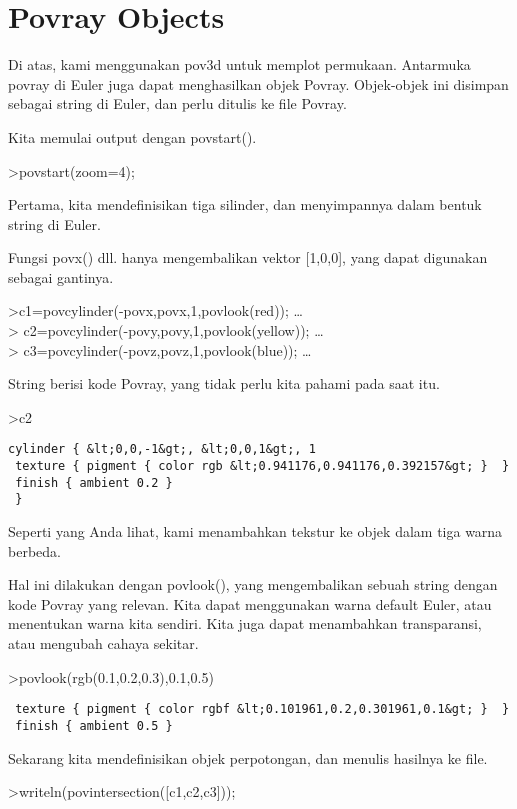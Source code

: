 \documentclass[
]{book}
\begin{document}
\chapter{Povray Objects}\label{povray-objects}

Di atas, kami menggunakan pov3d untuk memplot permukaan. Antarmuka povray di Euler juga dapat menghasilkan objek Povray. Objek-objek ini disimpan sebagai string di Euler, dan perlu ditulis ke file Povray.

Kita memulai output dengan povstart().

\textgreater povstart(zoom=4);

Pertama, kita mendefinisikan tiga silinder, dan menyimpannya dalam bentuk string di Euler.

Fungsi povx() dll. hanya mengembalikan vektor {[}1,0,0{]}, yang dapat digunakan sebagai gantinya.

\textgreater c1=povcylinder(-povx,povx,1,povlook(red)); \ldots{}\\
\textgreater{} c2=povcylinder(-povy,povy,1,povlook(yellow)); \ldots{}\\
\textgreater{} c3=povcylinder(-povz,povz,1,povlook(blue)); \ldots{}

String berisi kode Povray, yang tidak perlu kita pahami pada saat itu.

\textgreater c2

\begin{verbatim}
cylinder { &lt;0,0,-1&gt;, &lt;0,0,1&gt;, 1
 texture { pigment { color rgb &lt;0.941176,0.941176,0.392157&gt; }  } 
 finish { ambient 0.2 } 
 }
\end{verbatim}

Seperti yang Anda lihat, kami menambahkan tekstur ke objek dalam tiga warna berbeda.

Hal ini dilakukan dengan povlook(), yang mengembalikan sebuah string dengan kode Povray yang relevan. Kita dapat menggunakan warna default Euler, atau menentukan warna kita sendiri. Kita juga dapat menambahkan transparansi, atau mengubah cahaya sekitar.

\textgreater povlook(rgb(0.1,0.2,0.3),0.1,0.5)

\begin{verbatim}
 texture { pigment { color rgbf &lt;0.101961,0.2,0.301961,0.1&gt; }  } 
 finish { ambient 0.5 } 
\end{verbatim}

Sekarang kita mendefinisikan objek perpotongan, dan menulis hasilnya ke file.

\textgreater writeln(povintersection({[}c1,c2,c3{]}));
\end{document}

